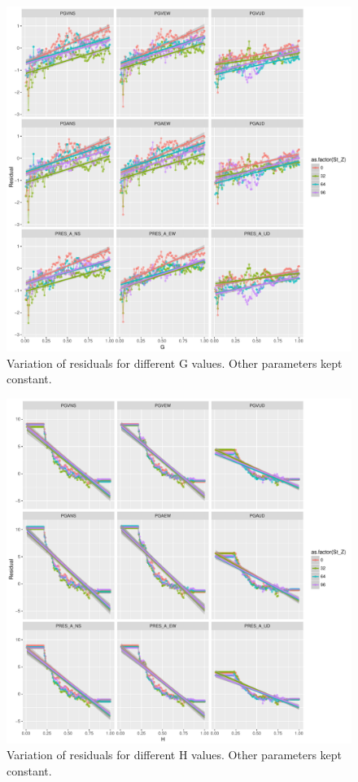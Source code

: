  \begin{figure}[H]
    \centering
    \includegraphics[width=\textwidth]{figures/pdf/G_var_ABC1_H0p6.pdf}
    \caption{Variation of residuals for different G values. Other parameters kept constant.}
    \label{fig:G_var_ABC1_H0p6}
\end{figure}

 \begin{figure}[H]
    \centering
    \includegraphics[width=\textwidth]{figures/pdf/H_var_ABC1_G0p25.pdf}
    \caption{Variation of residuals for different H values. Other parameters kept constant.}
    \label{fig:H_var_ABC1_G0p25}
\end{figure}

